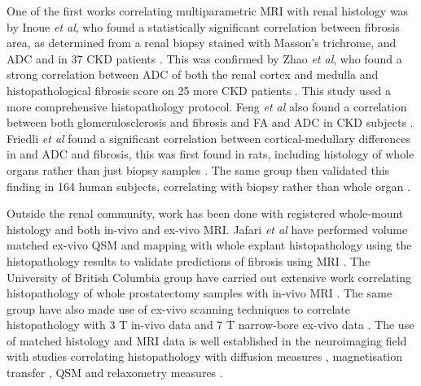 One of the first works correlating multiparametric \ac{MRI} with renal histology was by Inoue \textit{et al}, who found a statistically significant correlation between fibrosis area, as determined from a renal biopsy stained with Masson's trichrome, and \ac{ADC} and \ttwostar in 37 \ac{CKD} patients \cite{inoue_noninvasive_2011}. This was confirmed by Zhao \textit{et al}, who found a strong correlation between \ac{ADC} of both the renal cortex and medulla and histopathological fibrosis score on 25 more \ac{CKD} patients \cite{zhao_assessment_2014}. This study used a more comprehensive histopathology protocol. Feng \textit{et al} also found a correlation between both glomerulosclerosis and fibrosis and \ac{FA} and \ac{ADC} in \ac{CKD} subjects \cite{feng_dti_2015}. Friedli \textit{et al} found a significant correlation between cortical-medullary differences in \tone and \ac{ADC} and fibrosis, this was first found in rats, including histology of whole organs rather than just biopsy samples \cite{friedli_new_2016}. The same group then validated this finding in 164 human subjects, correlating with biopsy rather than whole organ \cite{berchtold_validation_2020}.

Outside the renal community, work has been done with registered whole-mount histology and both in-vivo and ex-vivo \ac{MRI}. Jafari \textit{et al} have performed volume matched ex-vivo \ac{QSM} and \ttwostar mapping with whole explant histopathology using the histopathology results to validate predictions of fibrosis using \ac{MRI} \cite{jafari_integrated_2021}. The University of British Columbia group have carried out extensive work correlating histopathology of whole prostatectomy samples with in-vivo \ac{MRI} \cite{sabouri_mr_2017, dhatt_mri_2020}. The same group have also made use of ex-vivo scanning techniques to correlate histopathology with 3 T in-vivo data and 7 T narrow-bore ex-vivo data \cite{uribe_vivo_2015}. The use of matched histology and \ac{MRI} data is well established in the neuroimaging field \cite{lazari_can_2021} with studies correlating histopathology with diffusion measures \cite{peters_white_2019, moll_multiple_2011, howard_joint_2019, mollink_white_2019}, magnetisation transfer \cite{mottershead_high_2003, seewann_diffusely_2009}, \ac{QSM} \cite{hametner_influence_2018, stuber_myelin_2014} and relaxometry measures \cite{bagnato_untangling_2018, reeves_combined_2016}.

